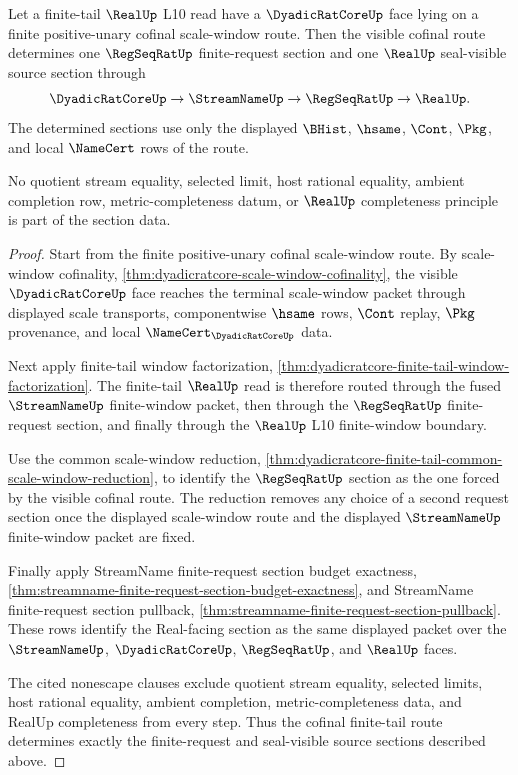 \begin{theorem}
\label{thm:dyadicratcore-finite-tail-cofinal-section}
Let a finite-tail $\RealUp$ L10 read have a $\DyadicRatCoreUp$ face lying on a finite positive-unary cofinal scale-window route. Then the visible cofinal route determines one $\RegSeqRatUp$ finite-request section and one $\RealUp$ seal-visible source section through
$$
\DyadicRatCoreUp \to \StreamNameUp \to \RegSeqRatUp \to \RealUp.
$$
The determined sections use only the displayed $\BHist$, $\hsame$, $\Cont$, $\Pkg$, and local $\NameCert$ rows of the route.

No quotient stream equality, selected limit, host rational equality, ambient completion row, metric-completeness datum, or $\RealUp$ completeness principle is part of the section data.
\end{theorem}
\begin{proof}
Start from the finite positive-unary cofinal scale-window route. By scale-window cofinality, \autoref{thm:dyadicratcore-scale-window-cofinality}, the visible $\DyadicRatCoreUp$ face reaches the terminal scale-window packet through displayed scale transports, componentwise $\hsame$ rows, $\Cont$ replay, $\Pkg$ provenance, and local $\NameCert_{\DyadicRatCoreUp}$ data.

Next apply finite-tail window factorization, \autoref{thm:dyadicratcore-finite-tail-window-factorization}. The finite-tail $\RealUp$ read is therefore routed through the fused $\StreamNameUp$ finite-window packet, then through the $\RegSeqRatUp$ finite-request section, and finally through the $\RealUp$ L10 finite-window boundary.

Use the common scale-window reduction, \autoref{thm:dyadicratcore-finite-tail-common-scale-window-reduction}, to identify the $\RegSeqRatUp$ section as the one forced by the visible cofinal route. The reduction removes any choice of a second request section once the displayed scale-window route and the displayed $\StreamNameUp$ finite-window packet are fixed.

Finally apply StreamName finite-request section budget exactness, \autoref{thm:streamname-finite-request-section-budget-exactness}, and StreamName finite-request section pullback, \autoref{thm:streamname-finite-request-section-pullback}. These rows identify the Real-facing section as the same displayed packet over the $\StreamNameUp$, $\DyadicRatCoreUp$, $\RegSeqRatUp$, and $\RealUp$ faces.

The cited nonescape clauses exclude quotient stream equality, selected limits, host rational equality, ambient completion, metric-completeness data, and RealUp completeness from every step. Thus the cofinal finite-tail route determines exactly the finite-request and seal-visible source sections described above.
\end{proof}

